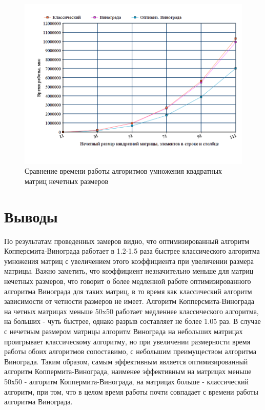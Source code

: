 \documentclass[a4paper,oneside,14pt]{extreport}
\begin{document}
\begin{figure}[H]
	\centering
	\includegraphics[width=1\linewidth]{images/even_mat}
	\caption{Сравнение времени работы алгоритмов умножения квадратных матриц нечетных размеров}
	\label{fig:even_graph}
\end{figure}

\section{Выводы}
По результатам проведенных замеров видно, что оптимизированный алгоритм Копперсмита-Винограда работает в 1.2-1.5 раза быстрее классического алгоритма умножения матриц с увеличением этого коэффициента при увеличении размера матрицы. Важно заметить, что коэффициент незначительно меньше для матриц нечетных размеров, что говорит о более медленной работе оптимизированного алгоритма Винограда для таких матриц, в то время как классический алгоритм зависимости от четности размеров не имеет. Алгоритм Копперсмита-Винограда на четных матрицах меньше 50x50 работает медленнее классического алгоритма, на больших - чуть быстрее, однако разрыв составляет не более 1.05 раз. В случае с нечетным размером матрицы алгоритм Винограда на небольших матрицах проигрывает классическому алгоритму, но при увеличении размерности время работы обоих алгоритмов сопоставимо, с небольшим преимуществом алгоритма Винограда. Таким образом, самым эффективным является оптимизированный алгоритм Коппермита-Винограда, наименее эффективным на матрицах меньше 50х50 - алгоритм Коппермита-Винограда, на матрицах больше - классический алгоритм, при том, что в целом время работы почти совпадает с времени работы алгоритма Винограда.
\newpage
\end{document}
